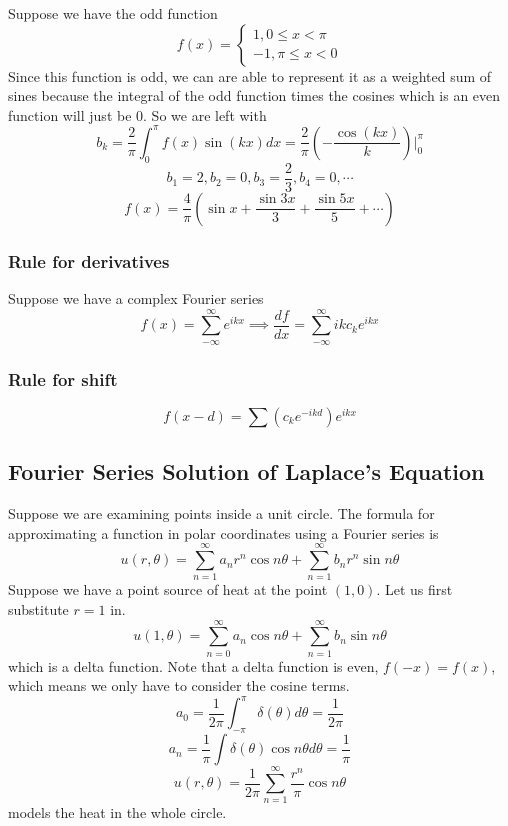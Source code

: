 \documentclass[12pt]{scrartcl}
\begin{document}
\begin{example}
    Suppose we have the odd function
    \begin{equation} f(x) = 
        \begin{cases}
            1, 0 \leq x < \pi \\
            -1, \pi \leq x < 0
        \end{cases}
    \end{equation}
Since this function is odd, we can are able to represent it as a weighted sum of sines because the integral of the odd function times the cosines which is an even function will just be 0. So we are left with
\[b_k = \frac{2}{\pi}\int_0^\pi f(x) \sin(kx) dx = \frac{2}{\pi}(-\frac{\cos(kx)}{k})|_0^\pi\]
\[b_1 = 2, b_2 = 0, b_3 = \frac{2}{3}, b_4 = 0, \cdots\]
\[f(x) = \frac{4}{\pi}(\sin x + \frac{\sin 3x}{3} + \frac{\sin 5x}{5}+ \cdots)\]

\end{example}

\subsubsection{Rule for derivatives}
Suppose we have a complex Fourier series
\[f(x) = \sum_{-\infty}^\infty e^{ikx} \implies \frac{df}{dx} = \sum_{-\infty}^\infty ikc_ke^{ikx}\]

\subsubsection{Rule for shift}
\[f(x-d) = \sum (c_ke^{-ikd})e^{ikx}\]

\subsection{Fourier Series Solution of Laplace's Equation}

\begin{example}
Suppose we are examining points inside a unit circle. The formula for approximating a function in polar coordinates using a Fourier series is 
\[u(r, \theta) = \sum_{n=1}^\infty a_n r^n \cos n\theta + \sum_{n=1}^\infty b_nr^n\sin n \theta\]
Suppose we have a point source of heat at the point $(1,0)$. Let us first substitute $r = 1$ in.
\[u(1, \theta) = \sum_{n=0}^\infty a_n \cos n \theta + \sum_{n=1}^\infty b_n \sin n \theta\] which is a delta function. Note that a delta function is even, $f(-x) = f(x)$, which means we only have to consider the cosine terms.
\[a_0 = \frac{1}{2\pi}\int_{-\pi}^\pi \delta(\theta) d \theta = \frac{1}{2\pi}\]
\[a_n = \frac{1}{\pi}\int \delta(\theta) \cos n \theta d \theta = \frac{1}{\pi}\]
\[u(r,\theta) = \frac{1}{2\pi}\sum_{n=1}^\infty \frac{r^n}{\pi}\cos n \theta\] models the heat in the whole circle.
    
\end{example}
\end{document}
